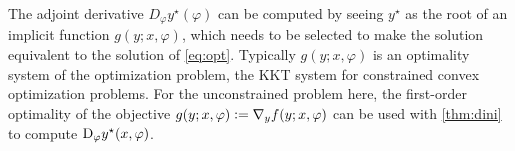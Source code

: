 The adjoint derivative $D_\varphi y^\star(\varphi)$ can be computed
by seeing $y^\star$ as the root of an implicit
function $g(y;x,\varphi)$, which needs to be selected to
make the solution equivalent to the solution of \cref{eq:opt}.
Typically $g(y;x,\varphi)$ is an optimality system of
the optimization problem, \eg the KKT system
for constrained convex optimization problems.
For the unconstrained problem here,
the first-order optimality of
the objective $g(y;x, \varphi) \vcentcolon= \nabla_y f(y; x, \varphi)$
can be used with \cref{thm:dini} to compute
$\mathrm{D}_\varphi y^\star(x, \varphi)$.

